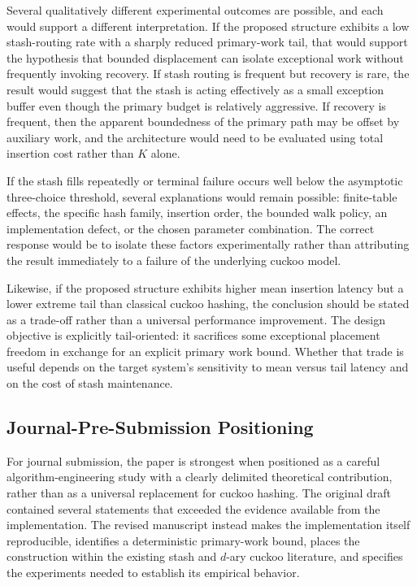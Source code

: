 \documentclass[conference]{IEEEtran}
\begin{document}
Several qualitatively different experimental outcomes are possible, and each
would support a different interpretation. If the proposed structure exhibits a
low stash-routing rate with a sharply reduced primary-work tail, that would
support the hypothesis that bounded displacement can isolate exceptional work
without frequently invoking recovery. If stash routing is frequent but
recovery is rare, the result would suggest that the stash is acting effectively
as a small exception buffer even though the primary budget is relatively
aggressive. If recovery is frequent, then the apparent boundedness of the
primary path may be offset by auxiliary work, and the architecture would need
to be evaluated using total insertion cost rather than $K$ alone.

If the stash fills repeatedly or terminal failure occurs well below the
asymptotic three-choice threshold, several explanations would remain possible:
finite-table effects, the specific hash family, insertion order, the bounded
walk policy, an implementation defect, or the chosen parameter combination.
The correct response would be to isolate these factors experimentally rather
than attributing the result immediately to a failure of the underlying cuckoo
model.

Likewise, if the proposed structure exhibits higher mean insertion latency but
a lower extreme tail than classical cuckoo hashing, the conclusion should be
stated as a trade-off rather than a universal performance improvement. The
design objective is explicitly tail-oriented: it sacrifices some exceptional
placement freedom in exchange for an explicit primary work bound. Whether
that trade is useful depends on the target system's sensitivity to mean versus
tail latency and on the cost of stash maintenance.

\subsection{Journal-Pre-Submission Positioning}
\label{subsec:discussion_positioning}

For journal submission, the paper is strongest when positioned as a careful
algorithm-engineering study with a clearly delimited theoretical contribution,
rather than as a universal replacement for cuckoo hashing. The original draft
contained several statements that exceeded the evidence available from the
implementation. The revised manuscript instead makes the implementation
itself reproducible, identifies a deterministic primary-work bound, places the
construction within the existing stash and $d$-ary cuckoo literature, and
specifies the experiments needed to establish its empirical behavior.
\end{document}
